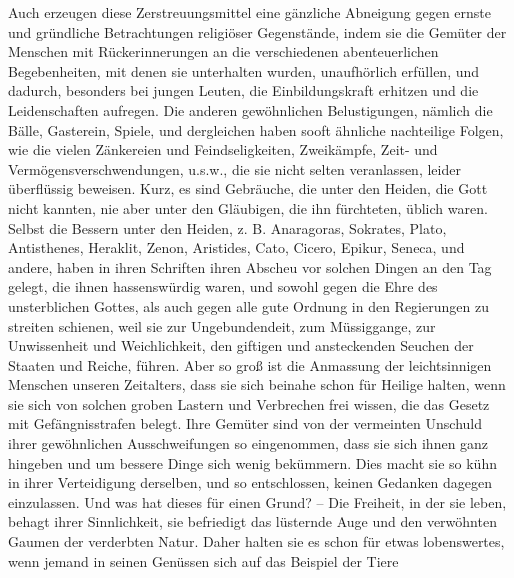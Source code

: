 Auch erzeugen diese Zerstreuungsmittel eine gänzliche Abneigung gegen ernste und
gründliche Betrachtungen religiöser Gegenstände, indem sie die Gemüter der
Menschen mit Rückerinnerungen an die verschiedenen abenteuerlichen
Begebenheiten, mit denen sie unterhalten wurden, unaufhörlich erfüllen, und
dadurch, besonders bei jungen Leuten, die
Einbildungskraft 
erhitzen und die
Leidenschaften aufregen. Die anderen gewöhnlichen
Belustigungen, nämlich die
Bälle, Gasterein, Spiele, und dergleichen haben sooft ähnliche nachteilige
Folgen, wie
die vielen Zänkereien und Feindseligkeiten, Zweikämpfe, Zeit- und
Vermögensverschwendungen, u.s.w., die sie nicht selten veranlassen, leider
überflüssig beweisen. Kurz, es sind Gebräuche, die unter den
Heiden, die Gott
nicht kannten, nie aber unter den Gläubigen, die ihn fürchteten, üblich waren.
Selbst die Bessern unter den Heiden, z. B.
Anaragoras, Sokrates, Plato,
Antisthenes, Heraklit, 
Zenon, Aristides,
Cato, 
Cicero, Epikur,
Seneca, und
andere, haben in ihren Schriften ihren Abscheu vor solchen Dingen an den Tag
gelegt, die ihnen hassenswürdig waren, und sowohl gegen die Ehre des
unsterblichen Gottes, als auch gegen alle gute Ordnung in den
Regierungen zu
streiten schienen, weil sie zur Ungebundendeit, zum Müssiggange, zur
Unwissenheit
und Weichlichkeit, den giftigen und ansteckenden Seuchen der
Staaten und 
Reiche,
führen. Aber so groß ist die Anmassung der leichtsinnigen Menschen unseren
Zeitalters, dass sie sich beinahe schon für Heilige halten, wenn sie sich von
solchen groben Lastern und Verbrechen frei wissen, die das Gesetz mit
Gefängnisstrafen belegt. Ihre Gemüter sind von der vermeinten Unschuld ihrer
gewöhnlichen Ausschweifungen so eingenommen, dass sie sich ihnen ganz hingeben
und um bessere Dinge sich wenig bekümmern. Dies macht sie so kühn in ihrer
Verteidigung derselben, und so entschlossen, keinen Gedanken dagegen
einzulassen. Und was hat dieses für einen Grund? -- Die Freiheit, in der sie
leben, behagt ihrer Sinnlichkeit, sie befriedigt das lüsternde Auge und den
verwöhnten Gaumen der verderbten Natur. Daher halten sie es schon für etwas
lobenswertes, wenn jemand in seinen Genüssen sich auf das Beispiel der Tiere
